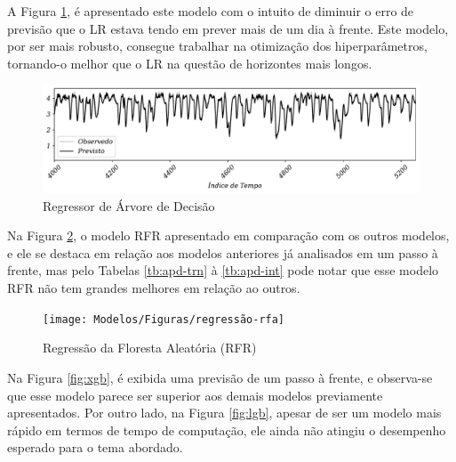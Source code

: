 %
%	
%	

A Figura \ref{fig:decision-tree-regressor}, é apresentado este modelo com o intuito de diminuir o erro de previsão que o LR estava tendo em prever mais de um dia à frente. Este modelo, por ser mais robusto, consegue trabalhar na otimização dos hiperparâmetros, tornando-o melhor que o LR na questão de horizontes mais longos.

\begin{figure}[H]
	\centering
	\caption{Regressor de \'Arvore de Decis\~ao }\label{fig:decision-tree-regressor}
	\includegraphics[width=1\linewidth]{Apendices/Figuras/modelagem-24h/Decision-Tree-Regressor}
	
	
\end{figure}

Na Figura \ref{fig:1-regressao-rfa}, o modelo RFR apresentado em comparação com os outros modelos, e ele se destaca em relação aos modelos anteriores já analisados em um passo à frente, mas pelo Tabelas \ref{tb:apd-trn} à \ref{tb:apd-int} pode notar que esse modelo RFR não tem grandes melhores em relação ao outros.


\begin{figure}[H]
	\centering
	\caption{Regressão da Floresta Aleatória (RFR)}
	\label{fig:1-regressao-rfa}
	\texttt{[image: Modelos/Figuras/regressão-rfa]}
	
	
\end{figure}

Na Figura \ref{fig:xgb}, é exibida uma previsão de um passo à frente, e observa-se que esse modelo parece ser superior aos demais modelos previamente apresentados. Por outro lado, na Figura \ref{fig:lgb}, apesar de ser um modelo mais rápido em termos de tempo de computação, ele ainda não atingiu o desempenho esperado para o tema abordado.

